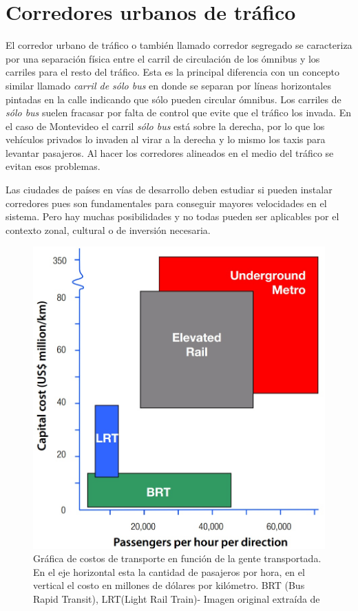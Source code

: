 \section{Corredores urbanos de tráfico}

El corredor urbano de tráfico o también llamado corredor segregado se caracteriza por una separación física entre el carril de circulación de los ómnibus y los carriles para el resto del tráfico. 
Esta es la principal diferencia con un concepto similar llamado \emph{carril de sólo bus} en donde se separan por líneas horizontales pintadas en la calle indicando que sólo pueden circular ómnibus. Los carriles de \emph{sólo bus} suelen fracasar por falta de control que evite que el tráfico los invada. En el caso de Montevideo el carril \emph{sólo bus} está sobre la derecha, por lo que los vehículos privados lo invaden al virar a la derecha y lo mismo los taxis para levantar pasajeros. Al hacer los corredores alineados en el medio del tráfico se evitan esos problemas.  

Las ciudades de países en vías de desarrollo deben estudiar si pueden instalar corredores pues son fundamentales para conseguir mayores velocidades en el sistema. Pero hay muchas posibilidades y no todas pueden ser aplicables por el contexto zonal, cultural o de inversión necesaria.

\begin{figure}[H]
	\centering
	\includegraphics[width=0.5\linewidth]{Figures/costo_transporte}
	\caption{Gráfica de costos de transporte en función de la gente transportada. En el eje horizontal esta la cantidad de pasajeros por hora, en el vertical el costo en millones de dólares por kilómetro.  BRT (Bus Rapid Transit), LRT(Light Rail Train)- Imagen original extraída de \citep{ITDP}		
	}
	\label{fig:Grafica de costos de otros medios de transporte}
\end{figure}

